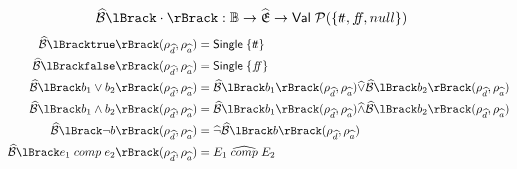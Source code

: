 \begin{align}
    \absboolsem{\cdot} &: \mathbb{B} \rightarrow \ab{\mathfrak{E}} \rightarrow \mathsf{Val} \; \mathcal{P}(\{\true, \false, null\}) \label{eq:bool-operation}
\end{align}
\begin{align}
    \absboolsem{\texttt{true}}(\rho_{\ab{d}}, \rho_{\ab{a}}) &= \mathsf{Single} \; \{\true\} \label{eq:abstract-bool-semantics-start} \\
    \absboolsem{\texttt{false}}(\rho_{\ab{d}}, \rho_{\ab{a}}) &= \mathsf{Single} \; \{\false\} \\
    \absboolsem{b_1 \lor b_2}(\rho_{\ab{d}}, \rho_{\ab{a}}) &= \absboolsem{b_1}(\rho_{\ab{d}}, \rho_{\ab{a}}) \ab{\lor} \absboolsem{b_2}(\rho_{\ab{d}}, \rho_{\ab{a}}) \\
    \absboolsem{b_1 \land b_2}(\rho_{\ab{d}}, \rho_{\ab{a}}) &= \absboolsem{b_1}(\rho_{\ab{d}}, \rho_{\ab{a}}) \ab{\land} \absboolsem{b_2}(\rho_{\ab{d}}, \rho_{\ab{a}}) \\
    \absboolsem{\neg b}(\rho_{\ab{d}}, \rho_{\ab{a}}) &= \ab{\neg} \absboolsem{b}(\rho_{\ab{d}}, \rho_{\ab{a}}) \\
    \absboolsem{e_1 \;comp\; e_2}(\rho_{\ab{d}}, \rho_{\ab{a}}) &= E_1 \;\ab{\comp}\; E_2\label{eq:abstract-bool-semantics-end}
\end{align}


